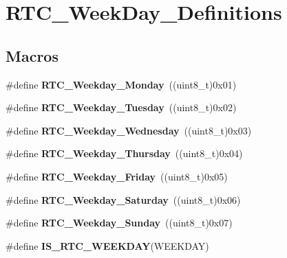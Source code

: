\hypertarget{group___r_t_c___week_day___definitions}{\section{R\-T\-C\-\_\-\-Week\-Day\-\_\-\-Definitions}
\label{group___r_t_c___week_day___definitions}
}
\subsection*{Macros}
\begin{DoxyCompactItemize}
\item 
\hypertarget{group___r_t_c___week_day___definitions_ga7401371e61060e5d5fa2bf81f5369f02}{\#define {\bfseries R\-T\-C\-\_\-\-Weekday\-\_\-\-Monday}~((uint8\-\_\-t)0x01)}\label{group___r_t_c___week_day___definitions_ga7401371e61060e5d5fa2bf81f5369f02}

\item 
\hypertarget{group___r_t_c___week_day___definitions_ga23f9646fb7114c436d4e822b88101757}{\#define {\bfseries R\-T\-C\-\_\-\-Weekday\-\_\-\-Tuesday}~((uint8\-\_\-t)0x02)}\label{group___r_t_c___week_day___definitions_ga23f9646fb7114c436d4e822b88101757}

\item 
\hypertarget{group___r_t_c___week_day___definitions_gaa8de8244a8b3e44001871aa74282d3ae}{\#define {\bfseries R\-T\-C\-\_\-\-Weekday\-\_\-\-Wednesday}~((uint8\-\_\-t)0x03)}\label{group___r_t_c___week_day___definitions_gaa8de8244a8b3e44001871aa74282d3ae}

\item 
\hypertarget{group___r_t_c___week_day___definitions_gac2413b21a6893d2003334f19b59e137d}{\#define {\bfseries R\-T\-C\-\_\-\-Weekday\-\_\-\-Thursday}~((uint8\-\_\-t)0x04)}\label{group___r_t_c___week_day___definitions_gac2413b21a6893d2003334f19b59e137d}

\item 
\hypertarget{group___r_t_c___week_day___definitions_ga556885ed7436fd0128e21ff48d7d0044}{\#define {\bfseries R\-T\-C\-\_\-\-Weekday\-\_\-\-Friday}~((uint8\-\_\-t)0x05)}\label{group___r_t_c___week_day___definitions_ga556885ed7436fd0128e21ff48d7d0044}

\item 
\hypertarget{group___r_t_c___week_day___definitions_gafdca8b8c2b9c56f9715efdf6ba96a8a9}{\#define {\bfseries R\-T\-C\-\_\-\-Weekday\-\_\-\-Saturday}~((uint8\-\_\-t)0x06)}\label{group___r_t_c___week_day___definitions_gafdca8b8c2b9c56f9715efdf6ba96a8a9}

\item 
\hypertarget{group___r_t_c___week_day___definitions_ga9a6a6992dfefab667878480f5565c928}{\#define {\bfseries R\-T\-C\-\_\-\-Weekday\-\_\-\-Sunday}~((uint8\-\_\-t)0x07)}\label{group___r_t_c___week_day___definitions_ga9a6a6992dfefab667878480f5565c928}

\item 
\#define {\bfseries I\-S\-\_\-\-R\-T\-C\-\_\-\-W\-E\-E\-K\-D\-A\-Y}(W\-E\-E\-K\-D\-A\-Y)
\end{DoxyCompactItemize}


